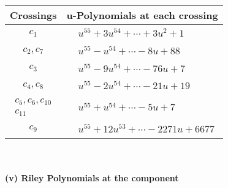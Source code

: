 \documentclass[1p]{elsarticle_modified}
\theoremstyle{definition}
\begin{document}
\begin{tabular}{m{50pt}|m{274pt}}
Crossings & \hspace{64pt}u-Polynomials at each crossing \\
\hline $$\begin{aligned}c_{1}\end{aligned}$$&$\begin{aligned}
&u^{55}+3 u^{54}+\cdots+3 u^2+1
\end{aligned}$\\
\hline $$\begin{aligned}c_{2},c_{7}\end{aligned}$$&$\begin{aligned}
&u^{55}- u^{54}+\cdots-8 u+88
\end{aligned}$\\
\hline $$\begin{aligned}c_{3}\end{aligned}$$&$\begin{aligned}
&u^{55}-9 u^{54}+\cdots-76 u+7
\end{aligned}$\\
\hline $$\begin{aligned}c_{4},c_{8}\end{aligned}$$&$\begin{aligned}
&u^{55}-2 u^{54}+\cdots-21 u+19
\end{aligned}$\\
\hline $$\begin{aligned}c_{5},c_{6},c_{10}\\c_{11}\end{aligned}$$&$\begin{aligned}
&u^{55}+u^{54}+\cdots-5 u+7
\end{aligned}$\\
\hline $$\begin{aligned}c_{9}\end{aligned}$$&$\begin{aligned}
&u^{55}+12 u^{53}+\cdots-2271 u+6677
\end{aligned}$\\
\hline
\end{tabular}\\~\\
\newpage\renewcommand{\arraystretch}{1}
\flushleft \textbf{(v) Riley Polynomials at the component}\newline \\
\end{document}

